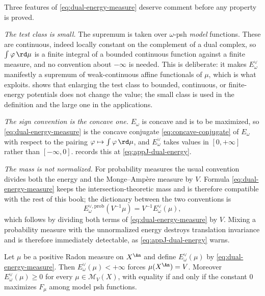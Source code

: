 Three features of \eqref{eq:dual-energy-measure} deserve comment before any
property is proved.

\emph{The test class is small.}  The supremum is taken over
$\omega$-psh \emph{model} functions.  These are continuous, indeed
locally constant on the complement of a dual complex, so
$\int\varphi\,\rd\mu$ is a finite integral of a bounded continuous function
against a finite measure, and no convention about $-\infty$ is needed.
This is deliberate: it makes $E^\vee_\omega$ manifestly a supremum of
weak-continuous affine functionals of $\mu$, which is what
 exploits.
 shows that enlarging the test class to bounded,
continuous, or finite-energy potentials does not change the value; the small
class is used in the definition and the large one in the applications.

\emph{The sign convention is the concave one.}  $E_\omega$ is concave and
is to be maximized, so \eqref{eq:dual-energy-measure} is the concave
conjugate \eqref{eq:concave-conjugate} of $E_\omega$ with respect to the
pairing $\varphi\mapsto\int\varphi\,\rd\mu$, and
$E^\vee_\omega$ takes values in $[0,+\infty]$ rather than
$[-\infty,0]$.   records this at
\eqref{eq:appJ-dual-energy}.

\emph{The mass is not normalized.}  For probability measures the usual
convention divides both the energy and the Monge--Amp\`ere measure by $V$.
Formula \eqref{eq:dual-energy-measure} keeps the intersection-theoretic mass
and is therefore compatible with the rest of this book; the dictionary
between the two conventions is
\begin{equation}
\label{eq:ch28-probability-dictionary}
 E_\omega^{\vee,\mathrm{prob}}(V^{-1}\mu)=V^{-1}E_\omega^\vee(\mu),
\end{equation}
which follows by dividing both terms of \eqref{eq:dual-energy-measure} by
$V$.  Mixing a probability measure with the unnormalized energy destroys
translation invariance and is therefore immediately detectable, as
\eqref{eq:appJ-dual-energy} warns.

\begin{lemma}
\label{lem:ch28-mass-forced}
Let $\mu$ be a positive Radon measure on $X^{\An}$ and define
$E^\vee_\omega(\mu)$ by \eqref{eq:dual-energy-measure}.  Then
$E^\vee_\omega(\mu)<+\infty$ forces $\mu(X^{\An})=V$.  Moreover
$E^\vee_\omega(\mu)\geq0$ for every $\mu\in\mathcal M_V(X)$, with
equality if and only if the constant $0$ maximizes $F_\mu$ among model
psh functions.
\end{lemma}

